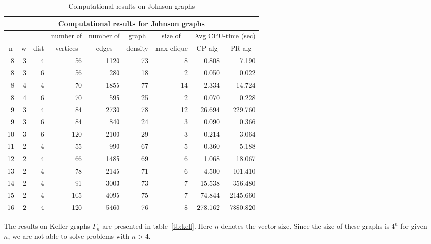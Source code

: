 \begin{table}[h]
\centering
\scriptsize
\begin{tabular}{||r|r|r|r|r|r|r|r|r||}
\hline
\multicolumn{9}{|c|}{Computational results for Johnson graphs} \\
\hline \hline
& & & \multicolumn{1}{c|}{number of} &
\multicolumn{1}{c|}{number of} &
\multicolumn{1}{c|}{graph} &
\multicolumn{1}{c|}{size of} &
\multicolumn{2}{c|}{Avg CPU-time {\tiny (sec)}} \\ \cline{8-9}
\multicolumn{1}{||c|}{n} &
\multicolumn{1}{|c|}{w} &
\multicolumn{1}{|c|}{dist} &
\multicolumn{1}{|c|}{vertices} &
\multicolumn{1}{|c|}{edges} &
\multicolumn{1}{|c|}{density} & 
\multicolumn{1}{|c|}{max clique} &
\multicolumn{1}{|c|}{CP-alg} &
\multicolumn{1}{|c||}{PR-alg} \\
\hline
8 & 3 & 4 & 56 & 1120 & 73 & 8 & 0.808 & 7.190\\
8 & 3 & 6 & 56 & 280 & 18 & 2 & 0.050 & 0.022\\
8 & 4 & 4 & 70 & 1855 & 77 & 14 & 2.334 &14.724\\ 
8 & 4 & 6 & 70 & 595 & 25 & 2 & 0.070 & 0.228\\ 
9 & 3 & 4 & 84 & 2730 & 78 & 12 & 26.694 & 229.760\\ 
9 & 3 & 6 & 84 & 840 & 24 & 3 & 0.090 & 0.366\\ 
10 & 3 & 6 & 120 & 2100 & 29 & 3 & 0.214 & 3.064\\ 
11 & 2 & 4 & 55 & 990 & 67 & 5 & 0.360 & 5.188\\ 
12 & 2 & 4 & 66 & 1485 & 69 & 6 & 1.068 & 18.067\\ 
13 & 2 & 4 & 78 & 2145 & 71 & 6 & 4.500 & 101.410\\ 
14 & 2 & 4 & 91 & 3003 & 73 & 7 & 15.538 & 356.480\\ 
15 & 2 & 4 & 105 & 4095 & 75 & 7 & 74.844 & 2145.660\\ 
16 & 2 & 4 & 120 & 5460 & 76 & 8 & 278.162 & 7880.820\\
\hline
\end{tabular}
\caption{Computational results on Johnson graphs}
\label{tb:john}
\end{table}

The results on Keller graphs $\Gamma_{n}$ are presented in
table~\ref{tb:kell}. Here $n$ denotes the vector size. Since the size of these
graphs is $4^n$ for given $n$, we are not able to solve problems with $n > 4$.

